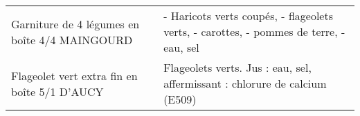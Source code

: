 \begin{longtable}{p{5cm}p{10cm}}
                                                            Garniture de 4 légumes en boîte 4/4 MAINGOURD &                                                                                                                                                                                                                                                                                                                                                                                                                                                                                                                                                                                                                                                                                                                                                                                                                                                                                                                                             - Haricots verts coupés,  - flageolets verts,   - carottes,   - pommes de terre,  - eau, sel \\
                                                             Flageolet vert extra fin en boîte 5/1 D'AUCY &                                                                                                                                                                                                                                                                                                                                                                                                                                                                                                                                                                                                                                                                                                                                                                                                                                                                                                                                                              Flageolets verts. Jus : eau, sel, affermissant : chlorure de calcium (E509) \\

\end{longtable}
